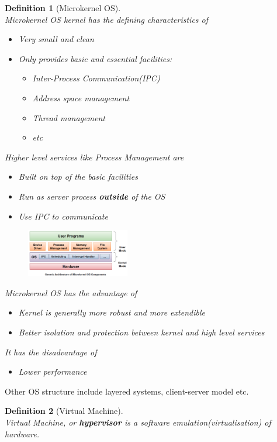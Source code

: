 \documentclass[12pt]{article}
\newtheorem{definition}{Definition}[section]
\theoremstyle{definition}
\begin{document}
\begin{definition}[Microkernel OS]
\hfill\\\normalfont Microkernel OS kernel has the defining characteristics of 
\begin{itemize}
  \item Very small and clean
  \item Only provides basic and essential facilities:
  \begin{itemize}
    \item Inter-Process Communication(IPC)
    \item Address space management
    \item Thread management
    \item etc
  \end{itemize}
\end{itemize}
Higher level services like Process Management are
\begin{itemize}
  \item Built \textit{on top of} the basic facilities
  \item Run as server process \textbf{outside} of the OS
  \item Use IPC to communicate
\end{itemize}
\begin{figure}[h]
\centering
\includegraphics[width = 0.4\textwidth]{1_7.png}
\end{figure}
Microkernel OS has the advantage of
\begin{itemize}
  \item Kernel is generally more robust and more extendible
  \item Better isolation and protection between kernel and high level services
\end{itemize}
It has the disadvantage of
\begin{itemize}
  \item Lower performance
\end{itemize}
\end{definition}
Other OS structure include layered systems, client-server model etc.
\begin{definition}[Virtual Machine]
\hfill\\\normalfont Virtual Machine, or \textbf{hypervisor} is a software emulation(virtualisation) of hardware.
\end{definition}
\end{document}
